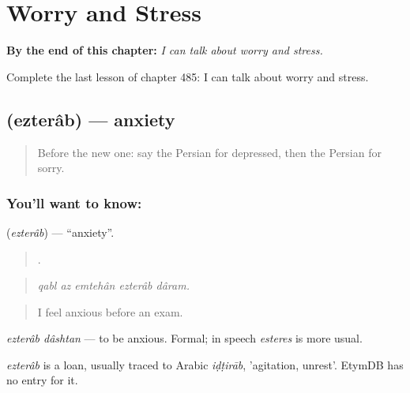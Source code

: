 
\chapter{Worry and Stress}
\label{ch:fa-worry-and-stress}

\begin{chapteropening}
\textbf{By the end of this chapter:} \emph{I can talk about worry and stress.}

Complete the last lesson of chapter 485: I can talk about worry and stress.
\end{chapteropening}

\section[\texorpdfstring{\fa{اضطراب} (ezterâb)}{اضطراب (ezterâb)}]{ (ezterâb) — anxiety}

\label{lesson:FA-C485-ezterab}



\begin{quote}
Before the new one: say the Persian for depressed, then the Persian for sorry.
\end{quote}

\subsection*{You'll want to know: }
\textbf{} (\emph{ezterâb}) — \textquotedblleft{}anxiety\textquotedblright{}.

\begin{quote}
    .
\end{quote}

\begin{quote}
\emph{qabl az emtehân ezterâb dâram.}
\end{quote}

\begin{quote}
I feel anxious before an exam.
\end{quote}

\emph{ezterâb dâshtan} — to be anxious. Formal; in speech \emph{esteres} is more usual.

\begin{cousinweb}
\emph{ezterâb} is a loan, usually traced to Arabic \emph{iḍṭirāb}, 'agitation, unrest'. EtymDB has no entry for it.
\end{cousinweb}

